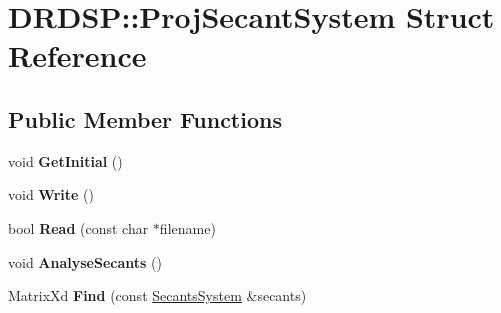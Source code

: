 \hypertarget{struct_d_r_d_s_p_1_1_proj_secant_system}{\section{D\-R\-D\-S\-P\-:\-:Proj\-Secant\-System Struct Reference}
\label{struct_d_r_d_s_p_1_1_proj_secant_system}
}
\subsection*{Public Member Functions}
\begin{DoxyCompactItemize}
\item 
\hypertarget{struct_d_r_d_s_p_1_1_proj_secant_system_a5d6a4518affe542bad190d8acebdfee1}{void {\bfseries Get\-Initial} ()}\label{struct_d_r_d_s_p_1_1_proj_secant_system_a5d6a4518affe542bad190d8acebdfee1}

\item 
\hypertarget{struct_d_r_d_s_p_1_1_proj_secant_system_a186551a11c603366a4d093b17d4a2ceb}{void {\bfseries Write} ()}\label{struct_d_r_d_s_p_1_1_proj_secant_system_a186551a11c603366a4d093b17d4a2ceb}

\item 
\hypertarget{struct_d_r_d_s_p_1_1_proj_secant_system_adef1918c84d8dd639d82213e49264335}{bool {\bfseries Read} (const char $\ast$filename)}\label{struct_d_r_d_s_p_1_1_proj_secant_system_adef1918c84d8dd639d82213e49264335}

\item 
\hypertarget{struct_d_r_d_s_p_1_1_proj_secant_system_aca95544bd5bad501f62d19c84f5e2d45}{void {\bfseries Analyse\-Secants} ()}\label{struct_d_r_d_s_p_1_1_proj_secant_system_aca95544bd5bad501f62d19c84f5e2d45}

\item 
\hypertarget{struct_d_r_d_s_p_1_1_proj_secant_system_a64bb2261a1d2dde458030ace8d9d42df}{Matrix\-Xd {\bfseries Find} (const \hyperlink{struct_d_r_d_s_p_1_1_secants_system}{Secants\-System} \&secants)}\label{struct_d_r_d_s_p_1_1_proj_secant_system_a64bb2261a1d2dde458030ace8d9d42df}

\end{DoxyCompactItemize}
